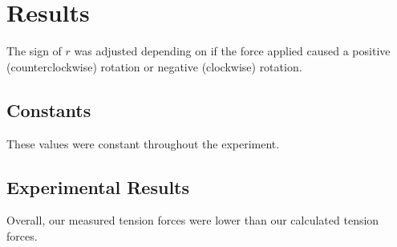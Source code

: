 \documentclass{article}
\begin{document}
\section*{Results}
The sign of $r$ was adjusted depending on if the force applied caused a positive (counterclockwise) rotation or negative (clockwise) rotation.
\subsection*{Constants}
These values were constant throughout the experiment.
\begin{center}
\end{center}
\subsection*{Experimental Results}
\begin{center}
\end{center}

Overall, our measured tension forces were lower than our calculated tension forces.
\end{document}
